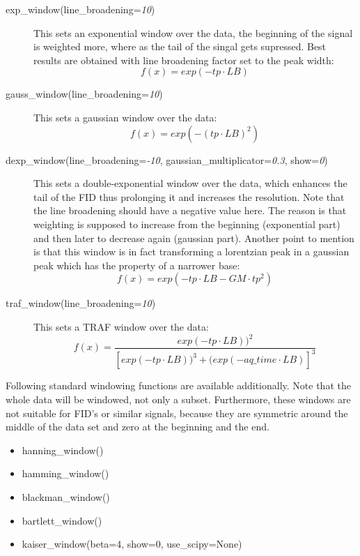 \documentclass[12pt, a4paper, BCOR10mm, twoside, titlepage, headinclude]{scrbook}
\begin{document}
\begin{description}
\item[exp\_window(line\_broadening=\textit{10})]
This sets an exponential window over the data, the beginning of the signal is weighted more, where as the tail of the singal gets supressed. Best results are obtained with line broadening factor set to the peak width:
\begin{equation*}
f(x)=exp(-tp\cdot LB)
\end{equation*}

\item[gauss\_window(line\_broadening=\textit{10})]
This sets a gaussian window over the data:
\begin{equation*}
f(x)=exp(-(tp \cdot LB)^2)
\end{equation*}

\item[dexp\_window(line\_broadening=\textit{-10}, gaussian\_multiplicator=\textit{0.3}, show=\textit{0})]
This sets a double-exponential window over the data, which enhances the tail of the FID  thus prolonging it and increases the resolution. Note that the line broadening should have a negative value here. The reason is that weighting is supposed to increase from the beginning (exponential part) and then later to decrease again (gaussian part). Another point to mention is that this window is in fact transforming a lorentzian peak in a gaussian peak which has the property of a narrower base:
\begin{equation*}
f(x)=exp(-tp\cdot LB - GM\cdot  tp^2)
\end{equation*}

\item[traf\_window(line\_broadening=\textit{10})]
This sets a \textsf{TRAF} window \citep{Traficante:1987fk} over the data:
\begin{equation*}
f(x)=\frac{exp(-tp\cdot LB))^2} {\left[exp(-tp\cdot LB))^3 
                + (exp(-aq\_time\cdot LB)\right]^3 }
\end{equation*}

\end{description}
Following standard windowing functions \citep{Butz:1998fr} are available additionally. Note that the whole data will be windowed, not only a subset. Furthermore, these windows are not suitable for FID's or similar signals, because they are symmetric around the middle of the data set and zero at the beginning and the end. 
\begin{itemize}
\item hanning\_window()
\item hamming\_window()
\item blackman\_window()
\item bartlett\_window()
\item kaiser\_window(beta=4, show=0, use\_scipy=None)
\end{itemize}
\end{document}
